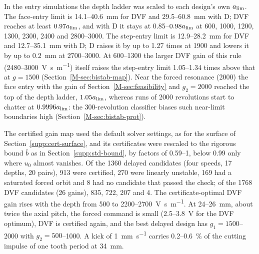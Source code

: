 In the entry simulations the depth ladder was scaled to each design's own $a_{\lim}$. The face-entry limit is 14.1--\SI{40.6}{\milli\metre} for DVF and 29.5--\SI{60.8}{\milli\metre} with D; DVF reaches at least $0.97a_{\lim}$, and with D it stays at 0.85--$0.98a_{\lim}$ at 600, 1000, 1200, 1300, 2300, 2400 and 2800--\SI{3000}{\rpm}. The step-entry limit is 12.9--\SI{28.2}{\milli\metre} for DVF and 12.7--\SI{35.1}{\milli\metre} with D; D raises it by up to 1.27 times at \SI{1900}{\rpm} and lowers it by up to \SI{0.2}{\milli\metre} at \SIrange{2700}{3000}{\rpm}. At \SIrange{600}{1300}{\rpm} the larger DVF gain of this rule (2480--\SI{3000}{\volt\second\per\metre}) itself raises the step-entry limit 1.05--1.34 times above that at $g=1500$ (Section~\ref{M-sec:bistab-map}). Near the forced resonance (\SI{2000}{\rpm}) the face entry with the gain of Section~\ref{M-sec:feasibility} and $g_2=2000$ reached the top of the depth ladder, $1.05a_{\lim}$, whereas runs of 2000 revolutions start to chatter at $0.9996a_{\lim}$: the 300-revolution classifier biases such near-limit boundaries high (Section~\ref{M-sec:bistab-prot}).

The certified gain map used the default solver settings, as for the surface of Section~\ref{supp:cert-surface}, and its certificates were rescaled to the rigorous bound $\bar b$ as in Section~\ref{supp:std-bound}, by factors of 0.59--1, below 0.99 only where $u_0$ almost vanishes. Of the 1360 delayed candidates (four speeds, 17 depths, 20 pairs), 913 were certified, 270 were linearly unstable, 169 had a saturated forced orbit and 8 had no candidate that passed the check; of the 1768 DVF candidates (26 gains), 835, 722, 207 and 4. The certificate-optimal DVF gain rises with the depth from 500 to 2200--\SI{2700}{\volt\second\per\metre}. At 24--\SI{26}{\milli\metre}, about twice the axial pitch, the forced command is small (2.5--\SI{3.8}{\volt} for the DVF optimum), DVF is certified again, and the best delayed design has $g_1=1500$--2000 with $g_2=500$--1000. A kick of \SI{1}{\milli\metre\per\second} carries 0.2--\SI{0.6}{\percent} of the cutting impulse of one tooth period at \SI{34}{\milli\metre}.

